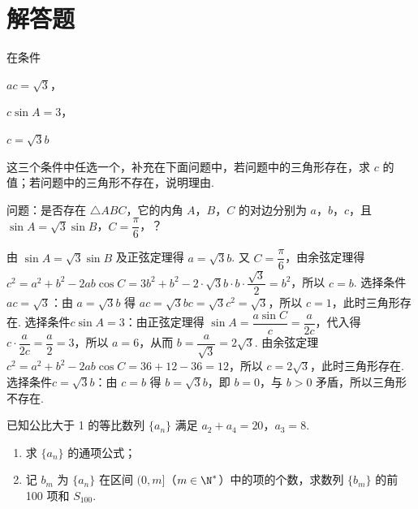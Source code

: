 \section{解答题}

\begin{problem}
在条件
\begin{circlelist}
\item \(ac=\sqrt{3}\)，
\item \(c\sin A=3\)，
\item \(c=\sqrt{3}b\)
\end{circlelist}
这三个条件中任选一个，补充在下面问题中，若问题中的三角形存在，求 \(c\) 的值；若问题中的三角形不存在，说明理由.

问题：是否存在 \(\triangle ABC\)，它的内角 \(A\)，\(B\)，\(C\) 的对边分别为 \(a\)，\(b\)，\(c\)，且 \(\sin A=\sqrt{3}\sin B\)，\(C=\dfrac{\pi}{6}\)，\fillinblank{}？
\end{problem}

\begin{solution}
由 \(\sin A=\sqrt{3}\sin B\) 及正弦定理得 \(a=\sqrt{3}b\). 又 \(C=\dfrac{\pi}{6}\)，由余弦定理得 \(c^2=a^2+b^2-2ab\cos C=3b^2+b^2-2\cdot\sqrt3b\cdot b\cdot\dfrac{\sqrt3}{2}=b^2\)，所以 \(c=b\).
选择条件\(ac=\sqrt{3}\)：由 \(a=\sqrt{3}b\) 得 \(ac=\sqrt3bc=\sqrt3c^2=\sqrt3\)，所以 \(c=1\)，此时三角形存在.
选择条件\(c\sin A=3\)：由正弦定理得 \(\sin A=\dfrac{a\sin C}{c}=\dfrac{a}{2c}\)，代入得 \(c\cdot\dfrac{a}{2c}=\dfrac a2=3\)，所以 \(a=6\)，从而 \(b=\dfrac a{\sqrt3}=2\sqrt3\). 由余弦定理 \(c^2=a^2+b^2-2ab\cos C=36+12-36=12\)，所以 \(c=2\sqrt3\)，此时三角形存在.
选择条件\(c=\sqrt{3}b\)：由 \(c=b\) 得 \(b=\sqrt{3}b\)，即 \(b=0\)，与 \(b>0\) 矛盾，所以三角形不存在.
\end{solution}

\begin{problem}
已知公比大于 1 的等比数列 \(\{a_n\}\) 满足 \(a_2+a_4=20\)，\(a_3=8\).

\begin{enumerate}
\item 求 \(\{a_n\}\) 的通项公式；
\item 记 \(b_m\) 为 \(\{a_n\}\) 在区间 \((0,m]\)（\(m\in\N^*\)）中的项的个数，求数列 \(\{b_m\}\) 的前 100 项和 \(S_{100}\).
\end{enumerate}
\end{problem}


